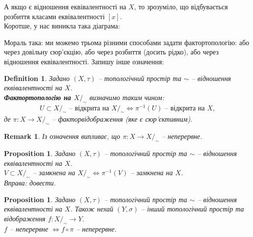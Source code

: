 \documentclass[a4paper, 10pt]{article}
\theoremstyle{theoremdd}
\newtheorem{definition}[theorem]{Definition}
\newtheorem{proposition}[theorem]{Proposition}
\newtheorem{remark}[theorem]{Remark}
\begin{document}
А якщо є відношення еквівалентності на $X$, то зрозуміло, що відбувається розбиття класами еквівалентності $[x]$.
\bigskip \\
Коротше, у нас виникла така діаграма:
\begin{figure}[H]
\centering
{}
\end{figure}
\noindent
Мораль така: ми можемо трьома різними способами задати фактортопологію: або через довільну сюр'єкцію, або через розбиття (досить рідко), або через відношення еквівалентності. Запишу інше означення:

\begin{definition}
Задано $(X,\tau)$ -- топологічний простір та $\sim$ -- відношення еквівалентності на $X$.\\
\textbf{Фактортопологію на $X/_\sim$} визначимо таким чином:
\begin{align*}
U \subset X/_\sim \text{ -- відкрита на } X/_\sim \iff \pi^{-1}(U) \text{ -- відкрита на }X,
\end{align*}
де $\pi \colon X \to X/_\sim$ -- факторвідображення (яке є сюр'єктивним).
\end{definition}

\begin{remark}
Із означення випливає, що $\pi \colon X \to X/_\sim$ -- неперервне.
\end{remark}

\begin{proposition}
Задано $(X,\tau)$ -- топологічний простір та $\sim$ -- відношення еквівалентності на $X$.\\
$V \subset X/_\sim$ -- замкнена на $X/_\sim \iff \pi^{-1}(V)$ -- замкнена на $X$.\\
\textit{Вправа: довести.}
\end{proposition}

\begin{proposition}
Задано $(X,\tau)$ -- топологічний простір та $\sim$ -- відношення еквівалентності на $X$. Також нехай $(Y,\sigma)$ -- інший топологічний простір та відображення $f \colon X/_\sim \to Y$.\\
$f$ -- неперервне $\iff f \circ \pi$ -- неперервне.
\end{proposition}
\end{document}
